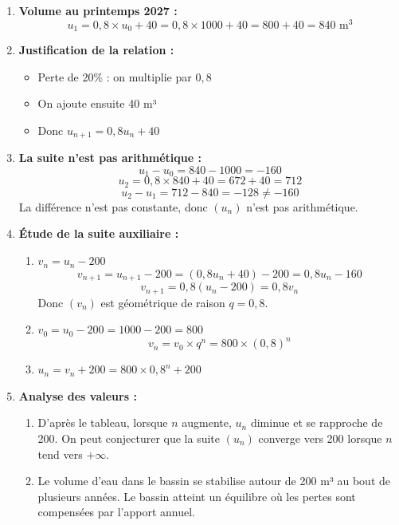 \documentclass[a4paper,12pt]{article}
\begin{document}
\begin{enumerate}
\item \textbf{Volume au printemps 2027 :}
\[
u_1 = 0,8 \times u_0 + 40 = 0,8 \times 1000 + 40 = 800 + 40 = 840 \text{ m}^3
\]

\item \textbf{Justification de la relation :}
\begin{itemize}
\item Perte de 20\% : on multiplie par \(0,8\)
\item On ajoute ensuite 40 m³
\item Donc \(u_{n+1} = 0,8 u_n + 40\)
\end{itemize}

\item \textbf{La suite n'est pas arithmétique :}
\[
u_1 - u_0 = 840 - 1000 = -160
\]
\[
u_2 = 0,8 \times 840 + 40 = 672 + 40 = 712
\]
\[
u_2 - u_1 = 712 - 840 = -128 \neq -160
\]
La différence n'est pas constante, donc \((u_n)\) n'est pas arithmétique.

\item \textbf{Étude de la suite auxiliaire :}
\begin{enumerate}
\item \(v_n = u_n - 200\)
\[
v_{n+1} = u_{n+1} - 200 = (0,8 u_n + 40) - 200 = 0,8 u_n - 160
\]
\[
v_{n+1} = 0,8(u_n - 200) = 0,8 v_n
\]
Donc \((v_n)\) est géométrique de raison \(q = 0,8\).

\item \(v_0 = u_0 - 200 = 1000 - 200 = 800\)
\[
v_n = v_0 \times q^n = 800 \times (0,8)^n
\]

\item \(u_n = v_n + 200 = 800 \times 0,8^n + 200\)
\end{enumerate}

\item \textbf{Analyse des valeurs :}
\begin{enumerate}
\item D'après le tableau, lorsque \(n\) augmente, \(u_n\) diminue et se rapproche de 200. On peut conjecturer que la suite \((u_n)\) converge vers 200 lorsque \(n\) tend vers \(+\infty\).
\item Le volume d'eau dans le bassin se stabilise autour de 200 m³ au bout de plusieurs années. Le bassin atteint un équilibre où les pertes sont compensées par l'apport annuel.
\end{enumerate}

\end{enumerate}
\end{document}
